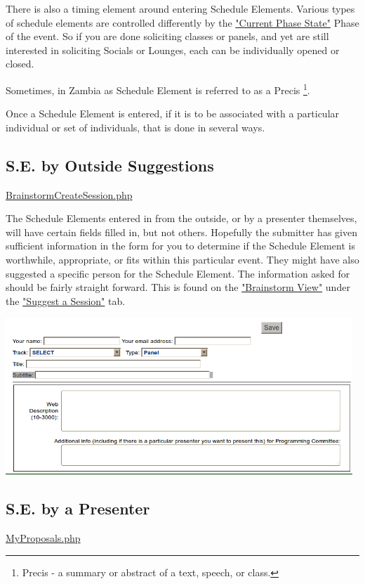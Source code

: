 \documentclass[captions=tablesignature]{scrartcl}
\begin{document}
There is also a timing element around entering Schedule Elements.
Various types of schedule elements are controlled differently by the
\href{../webpages/genreport.php?reportname=currentphasestate}{"Current Phase State"} Phase of the event.  So if you are done
soliciting classes or panels, and yet are still interested in
soliciting Socials or Lounges, each can be individually opened or
closed.

Sometimes, in Zambia as Schedule Element is referred to as a Precis
\footnote{Precis - a summary or abstract of a text, speech, or class.}.

Once a Schedule Element is entered, if it is to be associated with a
particular individual or set of individuals, that is done in several
ways.

\subsection{S.E. by Outside Suggestions}
\label{sec-5-1}
\href{../webpages/BrainstormCreateSession.php}{BrainstormCreateSession.php}

The Schedule Elements entered in from the outside, or by a
presenter themselves, will have certain fields filled in, but not
others.  Hopefully the submitter has given sufficient information
in the form for you to determine if the Schedule Element is
worthwhile, appropriate, or fits within this particular event.
They might have also suggested a specific person for the Schedule
Element.  The information asked for should be fairly
straight forward. This is found on the \href{../webpages/BrainstormWelcome.php}{"Brainstorm View"} under the
\href{../webpages/BrainstormCreateSession.php}{"Suggest a Session"} tab.

\includegraphics[width=0.98\textwidth]{./Images/Brainstorm_New_Session.png}
\subsection{S.E. by a Presenter}
\label{sec-5-2}
\href{../webpages/MyProposals.php}{MyProposals.php}
\end{document}
